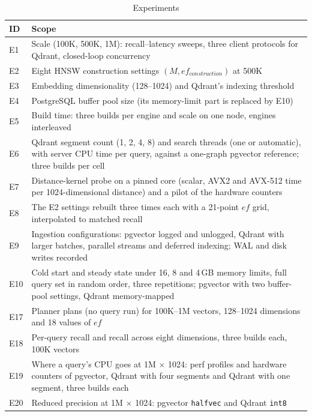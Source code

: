 \documentclass[preprint,12pt]{elsarticle}
\begin{document}
\begin{table}[t]
  \caption{Experiments}
  \label{tab:expmap}
  \small
  \begin{tabular}{p{}p{}}
    \toprule
    ID & Scope \\
    \midrule
    E1 & Scale (100K, 500K, 1M): recall--latency sweeps, three client protocols for Qdrant,
         closed-loop concurrency \\
    E2 & Eight HNSW construction settings $(M, ef_{construction})$ at 500K \\
    E3 & Embedding dimensionality (128--1024) and Qdrant's indexing threshold \\
    E4 & PostgreSQL buffer pool size (its memory-limit part is replaced by E10) \\
    E5 & Build time: three builds per engine and scale on one node, engines interleaved \\
    E6 & Qdrant segment count (1, 2, 4, 8) and search threads (one or automatic), with
         server CPU time per query, against a one-graph pgvector reference; three builds
         per cell \\
    E7 & Distance-kernel probe on a pinned core (scalar, AVX2 and AVX-512 time per 1024-dimensional distance) and a pilot of the hardware counters \\
    E8 & The E2 settings rebuilt three times each with a 21-point $ef$ grid, interpolated
         to matched recall \\
    E9 & Ingestion configurations: pgvector logged and unlogged, Qdrant with larger
         batches, parallel streams and deferred indexing; WAL and disk writes recorded \\
    E10 & Cold start and steady state under 16, 8 and 4\,GB memory limits, full query set in random
         order, three repetitions; pgvector with two buffer-pool settings, Qdrant memory-mapped \\
    E17 & Planner plans (no query run) for 100K--1M vectors, 128--1024 dimensions and 18 values of $ef$ \\
    E18 & Per-query recall and recall across eight dimensions, three builds each, 100K vectors \\
    E19 & Where a query's CPU goes at 1M $\times$ 1024: perf profiles and hardware counters of pgvector,
         Qdrant with four segments and Qdrant with one segment, three builds each \\
    E20 & Reduced precision at 1M $\times$ 1024: pgvector \texttt{halfvec} and Qdrant \texttt{int8}

\end{tabular}
\end{table}
\end{document}
